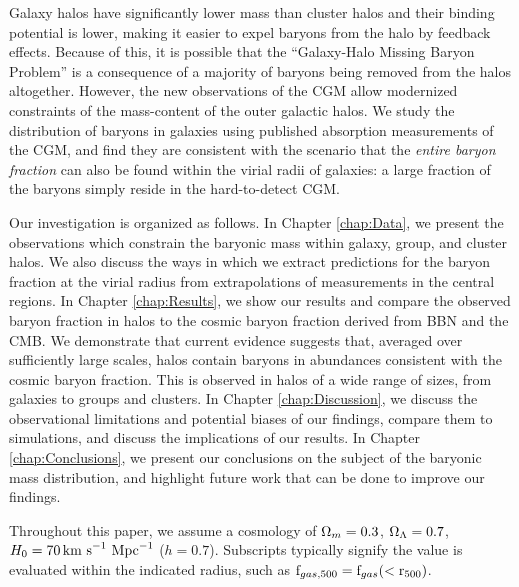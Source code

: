 Galaxy halos have significantly lower mass than cluster halos and
their binding potential is lower, making it easier to expel baryons
from the halo by feedback effects. Because of this, it is possible
that the ``Galaxy-Halo Missing Baryon Problem'' is a consequence of a
majority of baryons being removed from the halos altogether. However,
the new observations of the CGM allow modernized constraints of the
mass-content of the outer galactic halos. We study the distribution of
baryons in galaxies using published absorption measurements of the
CGM, and find they are consistent with the scenario that the
\textit{entire baryon fraction} can also be found within the virial
radii of galaxies: a large fraction of the baryons simply reside in
the hard-to-detect CGM.

Our investigation is organized as follows. In Chapter \ref{chap:Data},
we present the observations which constrain the baryonic mass within
galaxy, group, and cluster halos. We also discuss the ways in which we
extract predictions for the baryon fraction at the virial radius from
extrapolations of measurements in the central regions. In Chapter
\ref{chap:Results}, we show our results and compare the observed
baryon fraction in halos to the cosmic baryon fraction derived from
BBN and the CMB. We demonstrate that current evidence suggests that,
averaged over sufficiently large scales, halos contain baryons in
abundances consistent with the cosmic baryon fraction. This is
observed in halos of a wide range of sizes, from galaxies to groups
and clusters. In Chapter \ref{chap:Discussion}, we discuss the
observational limitations and potential biases of our findings,
compare them to simulations, and discuss the implications of our
results. In Chapter \ref{chap:Conclusions}, we present our conclusions
on the subject of the baryonic mass distribution, and highlight future
work that can be done to improve our findings.

Throughout this paper, we assume a cosmology of $\Omega_m = 0.3$,
$\Omega_\Lambda = 0.7$, $H_0 = 70\,\textrm{km~s}^{-1}~\textrm{Mpc}^{-1}$ ($h = 0.7$). Subscripts typically
signify the value is evaluated within the indicated radius, such as
$\textrm{f\ensuremath{_{gas,500}}}{} = \textrm{f\ensuremath{_{gas}}}{}(<\textrm{r\ensuremath{_{500}}})$.

